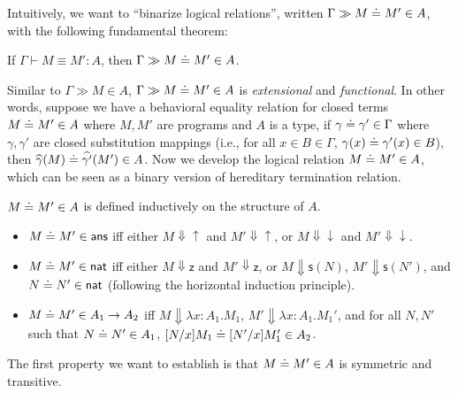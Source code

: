 \documentclass{article}
\newcommand{\G}{\Gamma}
\newcommand{\entails}{\vdash}
\newcommand{\eabs}[3]{\lambda #1:#2.#3}
\newcommand{\tans}{\mathsf{ans}}
\newcommand{\tnat}{\mathsf{nat}}
\newcommand{\eacc}{\uparrow}
\newcommand{\erej}{\downarrow}
\newcommand{\ez}{\mathsf{z}}
\newcommand{\es}[1]{\mathsf{s}(#1)}
\newcommand{\evalto}{\Downarrow}
\begin{document}
Intuitively, we want to ``binarize logical relations'', written $\G \gg M \eeq M' \in A$, with the following fundamental theorem:

\begin{theorem}[FTLR]
If $\G \entails M \equiv M' : A$, then $\G \gg M \eeq M' \in A$.
\end{theorem}

Similar to $\G \gg M \in A$, $\G \gg M \eeq M' \in A$ is \emph{extensional} and \emph{functional}.
In other words, suppose we have a behavioral equality relation for closed terms $M \doteq M' \in A$ where $M,M'$ are programs and $A$ is a type,
if $\gamma \eeq \gamma' \in \G$ where $\gamma,\gamma'$ are closed substitution mappings (i.e., for all $x \in B \in \G$, $\gamma(x) \doteq \gamma'(x) \in B$), then $\widehat{\gamma}(M) \doteq \widehat{\gamma'}(M') \in A$.
Now we develop the logical relation $M \doteq M' \in A$, which can be seen as a binary version of hereditary termination relation.

\begin{definition}
$M \doteq M' \in A$ is defined inductively on the structure of $A$.
\begin{itemize}
    \item $M \eeq M' \in \tans$ iff either $M \evalto {\eacc}$ and $M' \evalto {\eacc}$, or $M \evalto {\erej}$ and $M' \evalto {\erej}$.
    \item $M \eeq M' \in \tnat$ iff either $M \evalto \ez$ and $M' \evalto \ez$, or $M \evalto \es{N}$, $M' \evalto \es{N'}$, and $N \eeq N' \in \tnat$ (following the horizontal induction principle).
    \item $M \doteq M' \in A_1 \to A_2$ iff $M \evalto \eabs{x}{A_1}{M_1}$, $M' \evalto \eabs{x}{A_1}{M_1'}$,
    and for all $N,N'$ such that $N \doteq N' \in A_1$, $[N/x]M_1 \doteq [N'/x]M_1' \in A_2$.
\end{itemize}
\end{definition}

The first property we want to establish is that $M \doteq M' \in A$ is symmetric and transitive.
\end{document}
